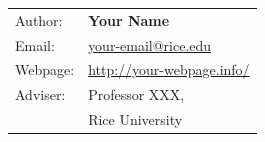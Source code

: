 \begin{titlepage}
\vspace{0.3cm}
\begin{table}[h!]
    \begin{tabular}{p{}p{}}
        Author: & \textbf{Your Name} \\
        Email: & \href{mailto:your-email@rice.edu}{your-email@rice.edu} \\
        Webpage: & \href{http://your-webpage.info/}{http://your-webpage.info/} \\
        Adviser: & Professor XXX, \\
                & Rice University
    \end{tabular}
\end{table}


\end{titlepage}
